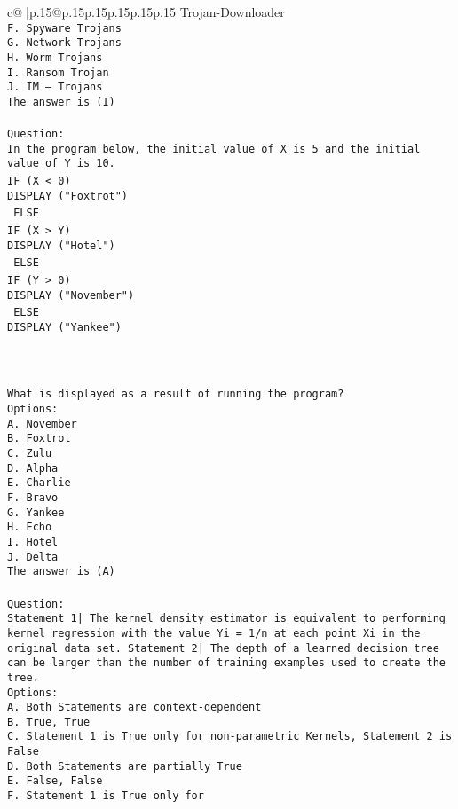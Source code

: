 \documentclass{article}
\begin{document}
{\begin{supertabular}{c@{$\;$}|p{.15\linewidth}@{}p{.15\linewidth}p{.15\linewidth}p{.15\linewidth}p{.15\linewidth}p{.15\linewidth}}
{{{Trojan-Downloader\\ \tt F. Spyware Trojans\\ \tt G. Network Trojans\\ \tt H. Worm Trojans\\ \tt I. Ransom Trojan\\ \tt J. IM – Trojans\\ \tt The answer is (I)\\ \tt \\ \tt Question:\\ \tt In the program below, the initial value of X is 5 and the initial value of Y is 10.\\ \tt IF (X < 0){\\ \tt  DISPLAY ("Foxtrot")\\ \tt } ELSE {\\ \tt  IF (X > Y){\\ \tt   DISPLAY ("Hotel")\\ \tt  } ELSE {\\ \tt   IF (Y > 0){\\ \tt    DISPLAY ("November")\\ \tt   } ELSE {\\ \tt    DISPLAY ("Yankee")\\ \tt   }\\ \tt  }\\ \tt }\\ \tt What is displayed as a result of running the program?\\ \tt Options:\\ \tt A. November\\ \tt B. Foxtrot\\ \tt C. Zulu\\ \tt D. Alpha\\ \tt E. Charlie\\ \tt F. Bravo\\ \tt G. Yankee\\ \tt H. Echo\\ \tt I. Hotel\\ \tt J. Delta\\ \tt The answer is (A)\\ \tt \\ \tt Question:\\ \tt Statement 1| The kernel density estimator is equivalent to performing kernel regression with the value Yi = 1/n at each point Xi in the original data set. Statement 2| The depth of a learned decision tree can be larger than the number of training examples used to create the tree.\\ \tt Options:\\ \tt A. Both Statements are context-dependent\\ \tt B. True, True\\ \tt C. Statement 1 is True only for non-parametric Kernels, Statement 2 is False\\ \tt D. Both Statements are partially True\\ \tt E. False, False\\ \tt F. Statement 1 is True only for }}}
\end{supertabular}}
\end{document}
